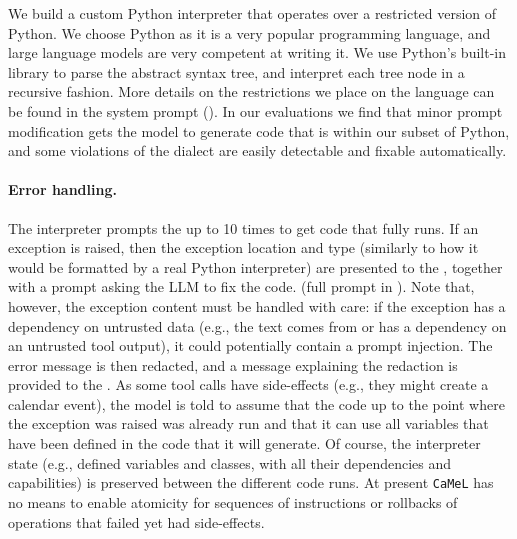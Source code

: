 \documentclass[11pt, a4paper, logo, copyright]{googledeepmind}
\newcommand{\sysname}{\texttt{CaMeL}\xspace}
\begin{document}
We build a custom Python interpreter that operates over a restricted version of Python. We choose Python as it is a very popular programming language, and large language models are very competent at writing it. We use Python's built-in  library to parse the abstract syntax tree, and interpret each tree node in a recursive fashion. More details on the restrictions we place on the language can be found in the \pllm system prompt (). In our evaluations we find that minor prompt modification gets the model to generate code that is within our subset of Python, and some violations of the dialect are easily detectable and fixable automatically.

\paragraph{Error handling.} The interpreter prompts the \pllm up to 10 times to get code that fully runs. If an exception is raised, then the exception location and type (similarly to how it would be formatted by a real Python interpreter) are presented to the \pllm, together with a prompt asking the LLM to fix the code. (full prompt in ).
Note that, however, the exception content must be handled with care: if the exception has a dependency on untrusted data (e.g., the text comes from or has a dependency on an untrusted tool output), it could potentially contain a prompt injection. The error message is then redacted, and a message explaining the redaction is provided to the \pllm. As some tool calls have side-effects (e.g., they might create a calendar event), the model is told to assume that the code up to the point where the exception was raised was already run and that it can use all variables that have been defined in the code that it will generate. Of course, the interpreter state (e.g., defined variables and classes, with all their dependencies and capabilities) is preserved between the different code runs. At present \sysname{} has no means to enable atomicity for sequences of instructions or rollbacks of operations that failed yet had side-effects.
\end{document}
